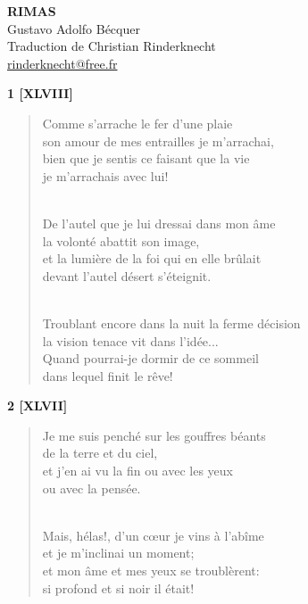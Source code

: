 \documentclass[a4paper,11pt]{book}
\begin{document}
\thispagestyle{empty}
\vspace*{70mm}
\begin{center}
{\Huge\textbf{RIMAS}} \\
\vspace*{10mm}
{\Large Gustavo Adolfo Bécquer} \\
\vspace*{10mm}
Traduction de Christian Rinderknecht\\
\url{rinderknecht@free.fr}
\end{center}

\cleardoublepage


\begin{center} {\bf 1 [XLVIII]} \end{center}

\begin{verse}
Comme s'arrache le fer d'une plaie \\
son amour de mes entrailles je m'arrachai, \\
bien que je sentis ce faisant que la vie \\
je m'arrachais avec lui! \\ \

De l'autel que je lui dressai dans mon âme \\
la volonté abattit son image, \\
et la lumière de la foi qui en elle brûlait \\
devant l'autel désert s'éteignit. \\ \

Troublant encore dans la nuit la ferme décision \\
la vision tenace vit dans l'idée... \\
Quand pourrai-je dormir de ce sommeil \\
dans lequel finit le rêve! \\
\end{verse}

\bigskip

\begin{center} {\bf 2 [XLVII]} \end{center}

\begin{verse}
Je me suis penché sur les gouffres béants\\
de la terre et du ciel, \\
et j'en ai vu la fin ou avec les yeux \\
ou avec la pensée. \\ \

Mais, hélas!, d'un c{\oe}ur je vins à l'abîme \\
et je m'inclinai un moment; \\
et mon âme et mes yeux se troublèrent: \\
si profond et si noir il était! \\
\end{verse}
\end{document}
